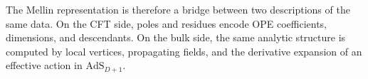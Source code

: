 The Mellin representation is therefore a bridge between two descriptions of
the same data.  On the CFT side, poles and residues encode OPE coefficients,
dimensions, and descendants.  On the bulk side, the same analytic structure is
computed by local vertices, propagating fields, and the derivative expansion
of an effective action in \(\mathrm{AdS}_{D+1}\).
